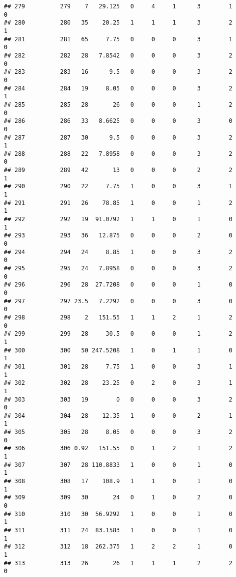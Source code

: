 \documentclass[
]{article}
\begin{document}
\begin{verbatim}
## 279          279    7   29.125   0     4     1      3        1         0
## 280          280   35    20.25   1     1     1      3        2         1
## 281          281   65     7.75   0     0     0      3        1         0
## 282          282   28   7.8542   0     0     0      3        2         0
## 283          283   16      9.5   0     0     0      3        2         0
## 284          284   19     8.05   0     0     0      3        2         1
## 285          285   28       26   0     0     0      1        2         0
## 286          286   33   8.6625   0     0     0      3        0         0
## 287          287   30      9.5   0     0     0      3        2         1
## 288          288   22   7.8958   0     0     0      3        2         0
## 289          289   42       13   0     0     0      2        2         1
## 290          290   22     7.75   1     0     0      3        1         1
## 291          291   26    78.85   1     0     0      1        2         1
## 292          292   19  91.0792   1     1     0      1        0         1
## 293          293   36   12.875   0     0     0      2        0         0
## 294          294   24     8.85   1     0     0      3        2         0
## 295          295   24   7.8958   0     0     0      3        2         0
## 296          296   28  27.7208   0     0     0      1        0         0
## 297          297 23.5   7.2292   0     0     0      3        0         0
## 298          298    2   151.55   1     1     2      1        2         0
## 299          299   28     30.5   0     0     0      1        2         1
## 300          300   50 247.5208   1     0     1      1        0         1
## 301          301   28     7.75   1     0     0      3        1         1
## 302          302   28    23.25   0     2     0      3        1         1
## 303          303   19        0   0     0     0      3        2         0
## 304          304   28    12.35   1     0     0      2        1         1
## 305          305   28     8.05   0     0     0      3        2         0
## 306          306 0.92   151.55   0     1     2      1        2         1
## 307          307   28 110.8833   1     0     0      1        0         1
## 308          308   17    108.9   1     1     0      1        0         1
## 309          309   30       24   0     1     0      2        0         0
## 310          310   30  56.9292   1     0     0      1        0         1
## 311          311   24  83.1583   1     0     0      1        0         1
## 312          312   18  262.375   1     2     2      1        0         1
## 313          313   26       26   1     1     1      2        2         0

\end{verbatim}
\end{document}
